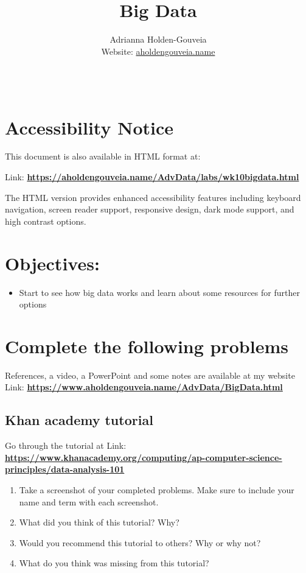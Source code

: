 \documentclass[12pt]{article}
\title{Big Data}
\author{
        Adrianna Holden-Gouveia \\
        Website: \href{https://aholdengouveia.name}{aholdengouveia.name}\\ 
        \date{\vspace{-5ex}}
        \faGithub {: aholdengouveia} \\
        }
\begin{document}
    

\maketitle



\section*{Accessibility Notice}
This document is also available in HTML format at:

Link: \href{https://aholdengouveia.name/AdvData/labs/wk10bigdata.html}{\textbf{https://aholdengouveia.name/AdvData/labs/wk10bigdata.html}}

The HTML version provides enhanced accessibility features including keyboard navigation, screen reader support, responsive design, dark mode support, and high contrast options.

\section*{Objectives:}
\begin{itemize}
    \item Start to see how big data works and learn about some resources for further options
\end{itemize}
\section*{Complete the following problems}

References, a video, a PowerPoint and some notes are available at my website
Link: \href{https://www.aholdengouveia.name/AdvData/BigData.html}{\textbf{https://www.aholdengouveia.name/AdvData/BigData.html}}

\subsection*{Khan academy tutorial}

Go through the tutorial at Link: \href{https://www.khanacademy.org/computing/ap-computer-science-principles/data-analysis-101}{\textbf{https://www.khanacademy.org/computing/ap-computer-science-principles/data-analysis-101}}


    \begin{enumerate}
        \item Take a screenshot of your completed problems.  Make sure to include your name and term with each screenshot. 
        \item What did you think of this tutorial? Why?
        \item Would you recommend this tutorial to others? Why or why not?
        \item What do you think was missing from this tutorial?
    \end{enumerate}
\end{document}
